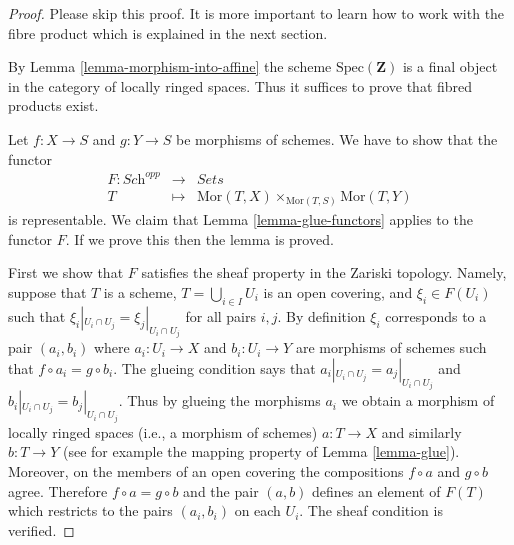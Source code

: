 \begin{proof}
Please skip this proof. It is more important to learn
how to work with the fibre product which is explained in
the next section.

\medskip\noindent
By Lemma \ref{lemma-morphism-into-affine}
the scheme $\text{Spec}(\mathbf{Z})$ is a final
object in the category of locally ringed spaces. Thus it
suffices to prove that fibred products exist.

\medskip\noindent
Let $f : X \to S$ and $g : Y \to S$ be morphisms of schemes. We have to show
that the functor
\begin{eqnarray*}
F : \textit{Sch}^{opp} & \longrightarrow & \textit{Sets} \\
T & \longmapsto &
\text{Mor}(T, X) \times_{\text{Mor}(T, S)} \text{Mor}(T, Y)
\end{eqnarray*}
is representable. We claim that Lemma \ref{lemma-glue-functors}
applies to the functor $F$. If we prove this then the lemma is proved.

\medskip\noindent
First we show that $F$ satisfies the sheaf property in the
Zariski topology. Namely, suppose that $T$ is a scheme,
$T = \bigcup_{i \in I} U_i$ is an open covering, and
$\xi_i \in F(U_i)$ such that
$\xi_i|_{U_i \cap U_j} =  \xi_j|_{U_i \cap U_j}$ for
all pairs $i, j$. By definition $\xi_i$ corresponds to
a pair $(a_i, b_i)$ where $a_i : U_i \to X$ and $b_i : U_i \to Y$
are morphisms of schemes such that $f \circ a_i = g \circ b_i$.
The glueing condition says that
$a_i|_{U_i \cap U_j} =  a_j|_{U_i \cap U_j}$
and
$b_i|_{U_i \cap U_j} =  b_j|_{U_i \cap U_j}$.
Thus by glueing the morphisms $a_i$ we obtain a morphism
of locally ringed spaces (i.e., a morphism of schemes)
$a : T \to X$ and similarly $b : T \to Y$ (see for example
the mapping property of Lemma \ref{lemma-glue}). Moreover,
on the members of an open covering the compositions
$f \circ a$ and $g \circ b$ agree. Therefore
$f \circ a = g \circ b$ and the pair $(a, b)$ defines
an element of $F(T)$ which restricts to the pairs
$(a_i, b_i)$ on each $U_i$. The sheaf condition is verified.


\end{proof}
